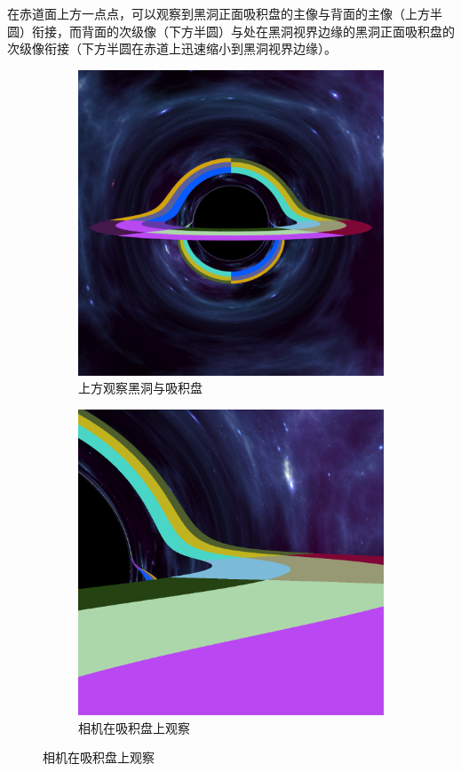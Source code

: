在赤道面上方一点点，可以观察到黑洞正面吸积盘的主像与背面的主像（上方半圆）衔接，而背面的次级像（下方半圆）与处在黑洞视界边缘的黑洞正面吸积盘的次级像衔接（下方半圆在赤道上迅速缩小到黑洞视界边缘）。
\begin{figure}[H]
    \centering
    \begin{subfigure}{.5\textwidth}
        \centering
        \includegraphics[width=.8\linewidth]{images/above_equatorial_plane.png}
        \caption{上方观察黑洞与吸积盘}
        \label{fig:above_equatorial_plane}
    \end{subfigure}%
    \begin{subfigure}{.5\textwidth}
        \centering
        \includegraphics[width=.8\linewidth]{images/stand_on_disk.png}
        \caption{相机在吸积盘上观察}
        \label{fig:einstein-ring}
    \end{subfigure}
\end{figure}

